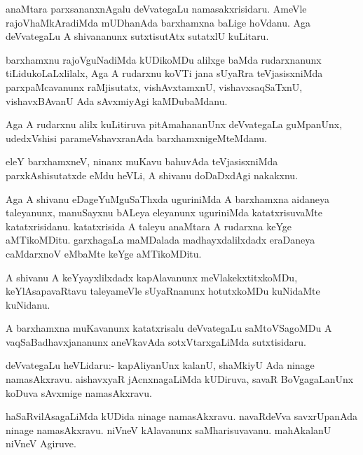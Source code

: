 \documentclass{article}
\begin{document}
\begin{mn}%
anaMtara parxsananxnAgalu deVvategaLu namasakxrisidaru. AmeVle
rajoVhaMkAradiMda mUDhanAda barxhamxna baLige hoVdanu. Aga deVvategaLu
A shivananunx sutxtisutAtx sutatxlU kuLitaru.
\end{mn}

\begin{mn}
barxhamxnu rajoVguNadiMda kUDikoMDu alilxge baMda rudarxnanunx
tiLidukoLaLxlilalx, Aga A rudarxnu koVTi jana sUyaRra teVjasisxniMda
parxpaMcavanunx raMjisutatx, vishAvxtamxnU, vishavxsaqSaTxnU,
vishavxBAvanU Ada sAvxmiyAgi kaMDubaMdanu.
\end{mn}

\begin{mn}%
Aga A rudarxnu alilx kuLitiruva pitAmahananUnx deVvategaLa guMpanUnx,
udedxVshisi parameVshavxranAda barxhamxnigeMteMdanu.
\end{mn}

\begin{mn}
eleY barxhamxneV, ninanx muKavu bahuvAda teVjasisxniMda
parxkAshisutatxde eMdu heVLi, A shivanu doDaDxdAgi nakakxnu.
\end{mn}

\begin{mn}%
Aga A shivanu eDageYuMguSaThxda uguriniMda A barxhamxna aidaneya
taleyanunx, manuSayxnu bALeya eleyanunx uguriniMda katatxrisuvaMte
katatxrisidanu. katatxrisida A taleyu anaMtara A rudarxna keYge
aMTikoMDitu. garxhagaLa maMDalada madhayxdalilxdadx eraDaneya
caMdarxnoV eMbaMte keYge aMTikoMDitu.
\end{mn}

\begin{mn}
A shivanu A keYyayxlilxdadx kapAlavanunx meVlakekxtitxkoMDu,
keYlAsapavaRtavu taleyameVle sUyaRnanunx hotutxkoMDu kuNidaMte kuNidanu.
\end{mn}

\begin{mn}%
A barxhamxna muKavanunx katatxrisalu deVvategaLu saMtoVSagoMDu A
vaqSaBadhavxjananunx aneVkavAda sotxVtarxgaLiMda sutxtisidaru.
\end{mn}

\begin{mn}
deVvategaLu heVLidaru:- kapAliyanUnx kalanU, shaMkiyU Ada ninage
namasAkxravu. aishavxyaR jAcnxnagaLiMda kUDiruva, savaR BoVgagaLanUnx
koDuva sAvxmige namasAkxravu.
\end{mn}

\begin{mn}%
haSaRvilAsagaLiMda kUDida ninage namasAkxravu. navaRdeVva savxrUpanAda
ninage namasAkxravu. niVneV kAlavanunx saMharisuvavanu. mahAkalanU
niVneV Agiruve.
\end{mn}
\end{document}
